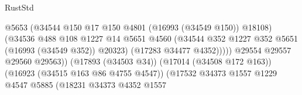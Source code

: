 \begin{lexlean}{RustStd}
\begin{coremodule}
                                                          @5653
                                                          (@34544
                                                            @150
                                                            @17
                                                            @150
                                                            @4801
                                                            (@16993 (@34549 @150))
                                                            @18108)
                                                          (@34536
                                                            @488
                                                            @108
                                                            @1227
                                                            @14
                                                            @5651
                                                            @4560
                                                            (@34544
                                                              @352
                                                              @1227
                                                              @352
                                                              @5651
                                                              (@16993 (@34549 @352))
                                                              @20323)
                                                            (@17283 @34477 @4352)))))
                                                    @29554
                                                    @29557
                                                    @29560
                                                    @29563))
                                                (@17893 (@34503 @34))
                                                (@17014 (@34508 @172 @163))
                                                (@16923 (@34515 @163 @86 @4755 @4547))
                                                (@17532
                                                  @34373
                                                  @1557
                                                  @1229
                                                  @4547
                                                  @5885
                                                  (@18231
                                                    @34373
                                                    @4352
                                                    @1557

\end{coremodule}
\end{lexlean}
